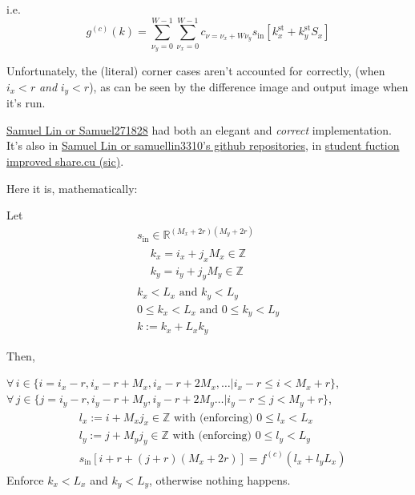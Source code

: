 \documentclass[10pt]{amsart}
\begin{document}
\begin{multicols*}{2}
i.e.
\[
g^{(c)}(k) = \sum_{\nu_y=0}^{W-1} \sum_{\nu_x =0}^{W-1} c_{\nu = \nu_x + W \nu_y} s_{\text{in}}[k_x^{\text{st}} + k_y^{\text{st}}S_x]
\]


Unfortunately, the (literal) corner cases aren't accounted for correctly, (when $i_x < r$ \emph{and } $i_y<r$), as can be seen by the difference image and output image when it's run.

\href{https://discussions.udacity.com/users/Samuel271828}{Samuel Lin or Samuel271828} had both an elegant and \emph{correct} implementation.  It's also in \href{https://github.com/samuellin3310}{Samuel Lin or samuellin3310's github repositories}, in \href{https://github.com/samuellin3310/ro-to-Parallel-Programming_set2/blob/master/student_fuction_improved_share.cu}{student fuction improved share.cu (sic)}.  


Here it is, mathematically:

\hrulefill

Let
\[
\begin{gathered}
  s_{\text{in}} \in \mathbb{R}^{(M_x + 2r)(M_y + 2r) } \\
  \begin{aligned}
    & k_x = i_x + j_x M_x \in \mathbb{Z} \\ 
    & k_y = i_y + j_y M_y \in \mathbb{Z}  
    \end{aligned} \\
  k_x < L_x \text{ and } k_y < L_y \\
  0 \leq k_x < L_x \text{ and } 0 \leq k_y < L_y \\
  k := k_x + L_x k_y
\end{gathered}
\]

Then,

$\forall \, i \in \lbrace i = i_x -r, i_x - r +M_x, i_x -r + 2M_x, \dots | i_x - r \leq i < M_x + r \rbrace$, \\
\phantom{ \qquad \, } $\forall \, j \in \lbrace j =i_y - r , i_y - r + M_y, i_y -r + 2M_y \dots | i_y - r \leq j < M_y + r \rbrace$,
\[
\begin{gathered}
  \begin{aligned}
    & l_x := i + M_x j_x \in \mathbb{Z} \text{ with (enforcing) } 0 \leq l_x < L_x \\ 
    & l_y := j + M_y j_y \in \mathbb{Z} \text{ with (enforcing) } 0 \leq l_y < L_y \\ 
    & s_{\text{in}}[i+r + (j+r)(M_x + 2r) ] = f^{(c)}(l_x + l_yL_x)
    \end{aligned}
\end{gathered}
\]
Enforce $k_x <L_x$ and $k_y <L_y$, otherwise nothing happens.  


\end{multicols*}
\end{document}
